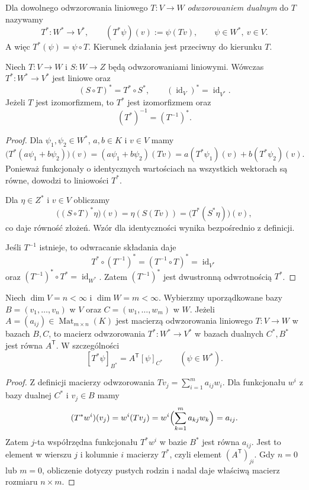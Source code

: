 \begin{definicja}
\label{def:lin7-odwzorowanie-dualne}
Dla dowolnego odwzorowania liniowego
\(T\colon V\to W\)
\emph{odwzorowaniem dualnym} do \(T\)
nazywamy
\[
 T^*\colon W^*\to V^*,
 \qquad
 (T^*\psi)(v):=\psi(Tv),
 \qquad \psi\in W^*,\ v\in V.
\]
A więc \(T^*(\psi)=\psi\circ T\).
Kierunek działania jest przeciwny
do kierunku \(T\).
\end{definicja}

\begin{twierdzenie}
\label{thm:lin7-funktorialnosc}
Niech \(T\colon V\to W\)
i \(S\colon W\to Z\) będą
odwzorowaniami liniowymi.
Wówczas \(T^*\colon W^*\to V^*\)
jest liniowe oraz
\[
 (S\circ T)^*=T^*\circ S^*,
 \qquad
 (\operatorname{id}_V)^*
 =\operatorname{id}_{V^*}.
\]
Jeżeli \(T\) jest izomorfizmem,
to \(T^*\) jest izomorfizmem oraz
\[
 (T^*)^{-1}=(T^{-1})^*.
\]
\end{twierdzenie}
\begin{proof}
Dla \(\psi_1,\psi_2\in W^*\),
\(a,b\in K\) i \(v\in V\) mamy
\[
 \bigl(T^*(a\psi_1+b\psi_2)\bigr)(v)
 =(a\psi_1+b\psi_2)(Tv)
 =a(T^*\psi_1)(v)+b(T^*\psi_2)(v).
\]
Ponieważ funkcjonały o identycznych
wartościach na wszystkich wektorach
są równe, dowodzi to liniowości \(T^*\).

Dla \(\eta\in Z^*\) i \(v\in V\)
obliczamy
\[
 \bigl((S\circ T)^*\eta\bigr)(v)
 =\eta(S(Tv))
 =\bigl(T^*(S^*\eta)\bigr)(v),
\]
co daje równość złożeń.
Wzór dla identyczności wynika
bezpośrednio z definicji.

Jeśli \(T^{-1}\) istnieje,
to odwracanie składania daje
\[
 T^*\circ(T^{-1})^*
 =(T^{-1}\circ T)^*
 =\operatorname{id}_{V^*}
\]
oraz
\((T^{-1})^*\circ T^*
 =\operatorname{id}_{W^*}\).
Zatem \((T^{-1})^*\)
jest dwustronną odwrotnością \(T^*\).
\end{proof}

\begin{twierdzenie}
\label{thm:lin7-macierz-dualnego}
Niech \(\dim V=n<\infty\) i
\(\dim W=m<\infty\).
Wybierzmy uporządkowane bazy
\(B=(v_1,\ldots,v_n)\) w \(V\)
oraz \(C=(w_1,\ldots,w_m)\) w \(W\).
Jeżeli \(A=(a_{ij})\in
\operatorname{Mat}_{m\times n}(K)\)
jest macierzą odwzorowania liniowego
\(T\colon V\to W\) w bazach \(B,C\),
to macierz odwzorowania
\(T^*\colon W^*\to V^*\)
w bazach dualnych \(C^*,B^*\)
jest równa \(A^{\mathsf T}\).
W szczególności
\[
 [T^*\psi]_{B^*}
  =A^{\mathsf T}[\psi]_{C^*}
 \qquad(\psi\in W^*).
\]
\end{twierdzenie}
\begin{proof}
Z definicji macierzy odwzorowania
\(Tv_j=\sum_{i=1}^m a_{ij}w_i\).
Dla funkcjonału \(w^i\)
z bazy dualnej \(C^*\)
i \(v_j\in B\) mamy
\[
 (T^*w^i)(v_j)
 =w^i(Tv_j)
 =w^i\Bigl(\sum_{k=1}^m a_{kj}w_k\Bigr)
 =a_{ij}.
\]
Zatem \(j\)-ta współrzędna
funkcjonału \(T^*w^i\)
w bazie \(B^*\) jest równa \(a_{ij}\).
Jest to element w wierszu \(j\)
i kolumnie \(i\) macierzy \(T^*\),
czyli element \((A^{\mathsf T})_{ji}\).
Gdy \(n=0\) lub \(m=0\),
obliczenie dotyczy pustych rodzin
i nadal daje właściwą macierz
rozmiaru \(n\times m\).
\end{proof}

